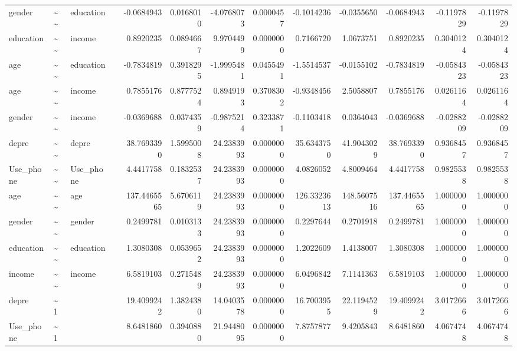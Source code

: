\documentclass[
]{article}
\begin{document}
\begin{table}[!h]
\begin{tabular}[t]{llllrrrrrrrrr}
\addlinespace
gender & \textasciitilde{}\textasciitilde{} & education &  & -0.0684943 & 0.0168010 & -4.0768073 & 0.0000457 & -0.1014236 & -0.0355650 & -0.0684943 & -0.1197829 & -0.1197829\\
education & \textasciitilde{}\textasciitilde{} & income &  & 0.8920235 & 0.0894667 & 9.9704499 & 0.0000000 & 0.7166720 & 1.0673751 & 0.8920235 & 0.3040124 & 0.3040124\\
age & \textasciitilde{}\textasciitilde{} & education &  & -0.7834819 & 0.3918295 & -1.9995481 & 0.0455491 & -1.5514537 & -0.0155102 & -0.7834819 & -0.0584323 & -0.0584323\\
age & \textasciitilde{}\textasciitilde{} & income &  & 0.7855176 & 0.8777524 & 0.8949193 & 0.3708302 & -0.9348456 & 2.5058807 & 0.7855176 & 0.0261164 & 0.0261164\\
gender & \textasciitilde{}\textasciitilde{} & income &  & -0.0369688 & 0.0374359 & -0.9875214 & 0.3233871 & -0.1103418 & 0.0364043 & -0.0369688 & -0.0288209 & -0.0288209\\
\addlinespace
depre & \textasciitilde{}\textasciitilde{} & depre &  & 38.7693390 & 1.5995008 & 24.2383993 & 0.0000000 & 35.6343750 & 41.9043029 & 38.7693390 & 0.9368457 & 0.9368457\\
Use\_phone & \textasciitilde{}\textasciitilde{} & Use\_phone &  & 4.4417758 & 0.1832537 & 24.2383993 & 0.0000000 & 4.0826052 & 4.8009464 & 4.4417758 & 0.9825538 & 0.9825538\\
age & \textasciitilde{}\textasciitilde{} & age &  & 137.4465565 & 5.6706119 & 24.2383993 & 0.0000000 & 126.3323613 & 148.5607516 & 137.4465565 & 1.0000000 & 1.0000000\\
gender & \textasciitilde{}\textasciitilde{} & gender &  & 0.2499781 & 0.0103133 & 24.2383993 & 0.0000000 & 0.2297644 & 0.2701918 & 0.2499781 & 1.0000000 & 1.0000000\\
education & \textasciitilde{}\textasciitilde{} & education &  & 1.3080308 & 0.0539652 & 24.2383993 & 0.0000000 & 1.2022609 & 1.4138007 & 1.3080308 & 1.0000000 & 1.0000000\\
\addlinespace
income & \textasciitilde{}\textasciitilde{} & income &  & 6.5819103 & 0.2715489 & 24.2383993 & 0.0000000 & 6.0496842 & 7.1141363 & 6.5819103 & 1.0000000 & 1.0000000\\
depre & \textasciitilde{}1 &  &  & 19.4099242 & 1.3824380 & 14.0403578 & 0.0000000 & 16.7003955 & 22.1194529 & 19.4099242 & 3.0172666 & 3.0172666\\
Use\_phone & \textasciitilde{}1 &  &  & 8.6481860 & 0.3940880 & 21.9448095 & 0.0000000 & 7.8757877 & 9.4205843 & 8.6481860 & 4.0674748 & 4.0674748\\

\end{tabular}
\end{table}
\end{document}
